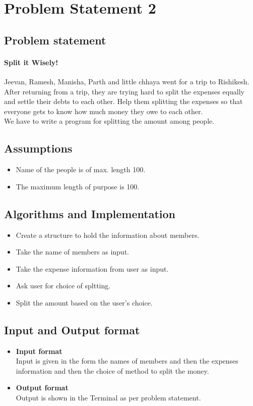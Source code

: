 \documentclass[12pt,a4paper]{article}
\begin{document}
    \section{Problem Statement 2}
        \subsection{Problem statement}
            \paragraph{Split it Wisely!}
			Jeevan, Ramesh, Manisha, Parth and little chhaya went for a trip to Rishikesh. After returning from a trip, they are trying hard to split the expenses equally and settle their debts to each other. Help them splitting the expenses so that everyone gets to know how much money they owe to each other.\\
			We have to write a program for splitting the amount among people.
        \subsection{Assumptions}
            \begin{itemize}
                \item Name of the people is of max. length 100.
                \item The maximum length of purpose is 100.
                
            \end{itemize}
        \subsection{Algorithms and Implementation}
            \begin{itemize}
                \item Create a structure to hold the information about members.
                \item Take the name of members as input.
                \item Take the expense information from user as input.
                \item Ask user for choice of spltting.
                \item Split the amount based on the user's choice.
            \end{itemize}
        \subsection{Input and Output format}
            \begin{itemize}
                \item \textbf{Input format}\\Input is given in the form the names of members and then the expenses information and then the choice of method to split the money.
                \item \textbf{Output format}\\Output is shown in the Terminal as per problem statement.
            \end{itemize}
\end{document}
